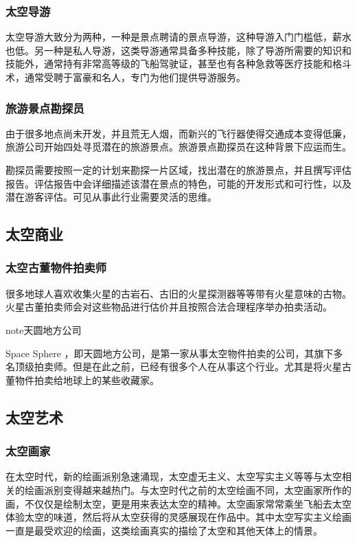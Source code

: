 \documentclass[letterpaper,10pt]{sphinxmanual}
\begin{document}
\subsubsection{太空导游}
\label{profession:id38}
太空导游大致分为两种，一种是景点聘请的景点导游，这种导游入门门槛低，薪水也低。另一种是私人导游，这类导游通常具备多种技能，除了导游所需要的知识和技能外，通常持有非常高等级的飞船驾驶证，甚至也有各种急救等医疗技能和格斗术，通常受聘于富豪和名人，专门为他们提供导游服务。


\subsubsection{旅游景点勘探员}
\label{profession:id39}
由于很多地点尚未开发，并且荒无人烟，而新兴的飞行器使得交通成本变得低廉，旅游公司开始四处寻觅潜在的旅游景点。旅游景点勘探员在这种背景下应运而生。

勘探员需要按照一定的计划来勘探一片区域，找出潜在的旅游景点，并且撰写评估报告。评估报告中会详细描述该潜在景点的特色，可能的开发形式和可行性，以及潜在游客评估。可见从事此行业需要灵活的思维。


\subsection{太空商业}
\label{profession:id40}

\subsubsection{太空古董物件拍卖师}
\label{profession:id41}
很多地球人喜欢收集火星的古岩石、古旧的火星探测器等等带有火星意味的古物。火星古董拍卖师会对这些物品进行估价并且按照合法合理程序举办拍卖活动。

\begin{notice}{note}{天圆地方公司}

Space Sphere ，即天圆地方公司，是第一家从事太空物件拍卖的公司，其旗下多名顶级拍卖师。但是在此之前，已经有很多个人在从事这个行业。尤其是将火星古董物件拍卖给地球上的某些收藏家。
\end{notice}


\subsection{太空艺术}
\label{profession:id42}

\subsubsection{太空画家}
\label{profession:id43}
在太空时代，新的绘画派别急速涌现，太空虚无主义、太空写实主义等等与太空相关的绘画派别变得越来越热门。与太空时代之前的太空绘画不同，太空画家所作的画，不仅仅是绘制太空，更是用来表达太空的精神。太空画家常常乘坐飞船去太空体验太空的味道，然后将从太空获得的灵感展现在作品中。其中太空写实主义绘画一直是最受欢迎的绘画，这类绘画真实的描绘了太空和其他天体上的情景。
\end{document}
